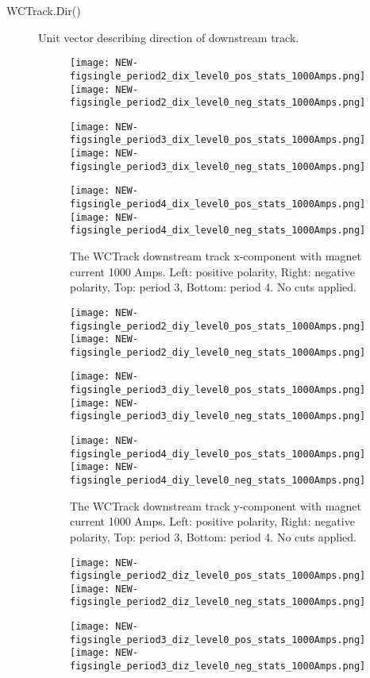 \begin{description}
{}
\item[WCTrack.Dir()]{
Unit vector describing direction of downstream track.

       \begin{figure}[h]	   
        	\texttt{[image: NEW-figsingle\_period2\_dix\_level0\_pos\_stats\_1000Amps.png]}
	 \texttt{[image: NEW-figsingle\_period2\_dix\_level0\_neg\_stats\_1000Amps.png]}
	 
   	\texttt{[image: NEW-figsingle\_period3\_dix\_level0\_pos\_stats\_1000Amps.png]}
	 \texttt{[image: NEW-figsingle\_period3\_dix\_level0\_neg\_stats\_1000Amps.png]}
	 
 	\texttt{[image: NEW-figsingle\_period4\_dix\_level0\_pos\_stats\_1000Amps.png]}
	 \texttt{[image: NEW-figsingle\_period4\_dix\_level0\_neg\_stats\_1000Amps.png]}
   \caption[short]{The WCTrack downstream track x-component with magnet current 1000 Amps. Left: positive polarity, Right: negative polarity, Top: period 3, Bottom: period 4. No cuts applied.}
   \label{fig_dix}
  \end{figure}
  
  
       \begin{figure}[h]	   
        	\texttt{[image: NEW-figsingle\_period2\_diy\_level0\_pos\_stats\_1000Amps.png]}
	 \texttt{[image: NEW-figsingle\_period2\_diy\_level0\_neg\_stats\_1000Amps.png]}
	 
   	\texttt{[image: NEW-figsingle\_period3\_diy\_level0\_pos\_stats\_1000Amps.png]}
	 \texttt{[image: NEW-figsingle\_period3\_diy\_level0\_neg\_stats\_1000Amps.png]}
	 
 	\texttt{[image: NEW-figsingle\_period4\_diy\_level0\_pos\_stats\_1000Amps.png]}
	 \texttt{[image: NEW-figsingle\_period4\_diy\_level0\_neg\_stats\_1000Amps.png]}
   \caption[short]{The WCTrack downstream track y-component with magnet current 1000 Amps. Left: positive polarity, Right: negative polarity, Top: period 3, Bottom: period 4. No cuts applied.}
   \label{fig_diy}
  \end{figure}
  
         \begin{figure}[h]	   
        	\texttt{[image: NEW-figsingle\_period2\_diz\_level0\_pos\_stats\_1000Amps.png]}
	 \texttt{[image: NEW-figsingle\_period2\_diz\_level0\_neg\_stats\_1000Amps.png]}
	 
   	\texttt{[image: NEW-figsingle\_period3\_diz\_level0\_pos\_stats\_1000Amps.png]}
	 \texttt{[image: NEW-figsingle\_period3\_diz\_level0\_neg\_stats\_1000Amps.png]}
	 

\end{figure}}
\end{description}
